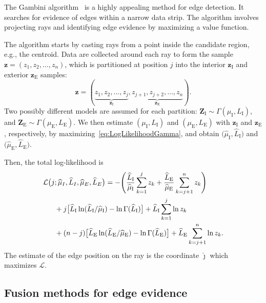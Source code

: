 \documentclass{article}
\begin{document}
The Gambini algorithm~\cite{Gambini2007} is a highly appealing method for edge detection. 
It searches for evidence of edges within a narrow data strip. 
The algorithm involves projecting rays and identifying edge evidence by maximizing a value function.

The algorithm starts by casting rays from a point inside the candidate region, e.g., the centroid.
Data are collected around each ray to form the sample $\bm z = (z_1,z_2,\dots,z_n)$, which is partitioned at position $j$ into the interior $\bm z_\text{I}$ and exterior $\bm z_\text{E}$ samples:
$$
\bm z = (\underbrace{z_1,z_2,\dots,z_j}_{\bm z_\text{I}}, 
\underbrace{z_{j+1}, z_{j+2},\dots,z_n}_{\bm z_\text{E}}).
$$
Two possibly different models are assumed for each partition:
$\bm Z_\text{I} \sim \Gamma(\mu_\text{I},L_\text{I})$, and 
$\bm Z_\text{E} \sim \Gamma(\mu_\text{E},L_\text{E})$.
We then estimate $(\mu_\text{I},L_\text{I})$ and $(\mu_\text{E},L_\text{E})$ with $\bm z_\text{I}$ and $\bm z_\text{E}$, respectively, by maximizing~\eqref{eq:LogLikelihoodGamma}, and obtain $\big(\widehat{\mu}_\text{I}, \widehat{L}_\text{I}\big)$ and $\big(\widehat{\mu}_\text{E}, \widehat{L}_\text{E}\big)$.

Then, the total log-likelihood is
\begin{equation}\label{eq:TotalLogLikelihood}
\begin{aligned}
\mathcal L\big(j&;\widehat{\mu}_I, \widehat{L}_I,\widehat{\mu}_E, \widehat{L}_E\big)= -\Bigg(
	\frac{\widehat{L}_\text{I}}{\widehat{\mu}_\text{I}}\sum_{k=1}^{j} z_k +
	\frac{\widehat{L}_\text{E}}{\widehat{\mu}_\text{E}}\sum_{k=j+1}^{n} z_k  
	\Bigg)\mbox{}\\
&+j \big[\widehat{L}_\text{I}\ln (\widehat{L}_\text{I} / \widehat{\mu}_\text{I}) - \ln \Gamma(\widehat{L}_\text{I})\big]
+\widehat{L}_\text{I} \sum_{k=1}^{j}\ln z_k  \mbox{}\\
&+(n-j) \big[\widehat{L}_\text{E}\ln (\widehat{L}_\text{E} / \widehat{\mu}_\text{E}) - \ln \Gamma(\widehat{L}_\text{E})\big]
+\widehat{L}_\text{E} \sum_{k=j+1}^{n}\ln z_k .%
\raisetag{2.2em}
\end{aligned}
\end{equation}
The estimate of the edge position on the ray is the coordinate  $\widehat\jmath$ which maximizes $\mathcal L$.

\subsection{Fusion methods for edge evidence}
\end{document}
